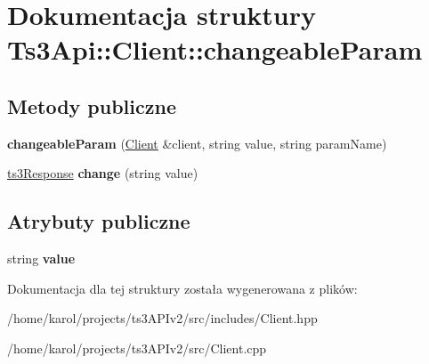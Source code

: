 \hypertarget{struct_ts3_api_1_1_client_1_1changeable_param}{}\section{Dokumentacja struktury Ts3\+Api\+:\+:Client\+:\+:changeable\+Param}
\label{struct_ts3_api_1_1_client_1_1changeable_param}
\subsection*{Metody publiczne}
\begin{DoxyCompactItemize}
\item 
{\bfseries changeable\+Param} (\hyperlink{class_ts3_api_1_1_client}{Client} \&client, string value, string param\+Name)\hypertarget{struct_ts3_api_1_1_client_1_1changeable_param_a1e378b376136300d1420542efc1e7e5d}{}\label{struct_ts3_api_1_1_client_1_1changeable_param_a1e378b376136300d1420542efc1e7e5d}

\item 
\hyperlink{struct_ts3_api_1_1ts3_response}{ts3\+Response} {\bfseries change} (string value)\hypertarget{struct_ts3_api_1_1_client_1_1changeable_param_ac3f3dd298ba1d2c0d5db342217c891af}{}\label{struct_ts3_api_1_1_client_1_1changeable_param_ac3f3dd298ba1d2c0d5db342217c891af}

\end{DoxyCompactItemize}
\subsection*{Atrybuty publiczne}
\begin{DoxyCompactItemize}
\item 
string {\bfseries value}\hypertarget{struct_ts3_api_1_1_client_1_1changeable_param_a4e3b8780f19688a682dc08e3e15912a3}{}\label{struct_ts3_api_1_1_client_1_1changeable_param_a4e3b8780f19688a682dc08e3e15912a3}

\end{DoxyCompactItemize}


Dokumentacja dla tej struktury została wygenerowana z plików\+:\begin{DoxyCompactItemize}
\item 
/home/karol/projects/ts3\+A\+P\+Iv2/src/includes/Client.\+hpp\item 
/home/karol/projects/ts3\+A\+P\+Iv2/src/Client.\+cpp\end{DoxyCompactItemize}
